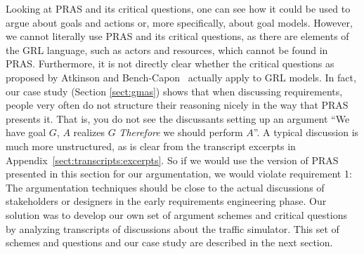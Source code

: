 Looking at PRAS and its critical questions, one can see how it could be used to argue about goals and actions or, more specifically, about goal models. However, we cannot literally use PRAS and its critical questions, as there are elements of the GRL language, such as actors and resources, which cannot be found in PRAS. Furthermore, it is not directly clear whether the critical questions as proposed by Atkinson and Bench-Capon~\cite{atkinson2007} actually apply to GRL models. In fact, our case study (Section \ref{sect:gmas}) shows that when discussing requirements, people very often do not structure their reasoning nicely in the way that PRAS presents it. That is, you do not see the discussants setting up an argument ``We have goal $G$, $A$ realizes $G$ \emph{Therefore} we should perform $A$''. A typical discussion is much more unstructured, as is clear from the transcript excerpts in Appendix~\ref{sect:transcripts:excerpts}. So if we would use the version of PRAS presented in this section for our argumentation, we would violate requirement 1: The argumentation techniques should be close to the actual discussions of stakeholders or designers in the early requirements engineering phase. Our solution was to develop our own set of argument schemes and critical questions by analyzing transcripts of discussions about the traffic simulator. This set of schemes and questions and our case study are described in the next section. 

